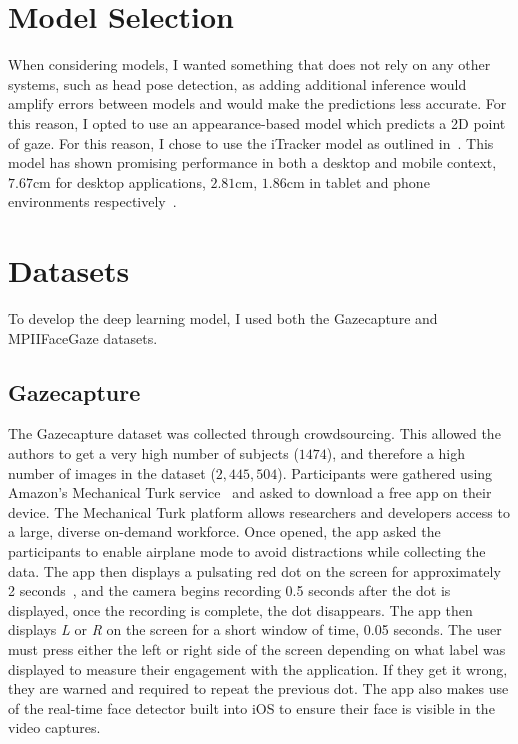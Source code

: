 \documentclass[twocolumn]{report}
\begin{document}
\section{Model Selection}

When considering models, I wanted something that does not rely on any other systems, such as head pose detection, as adding additional inference would amplify errors between models and would make the predictions less accurate. For this reason, I opted to use an appearance-based model which predicts a 2D point of gaze. For this reason, I chose to use the iTracker model as outlined in~\cite{krafka2016eye}. This model has shown promising performance in both a desktop and mobile context, \(7.67\text{cm}\) for desktop applications, \(2.81\text{cm}\), \(1.86\text{cm}\) in tablet and phone environments respectively~\cite{cheng2021survey}.

\section{Datasets}

To develop the deep learning model, I used both the Gazecapture and MPIIFaceGaze datasets. 

\subsection{Gazecapture}

The Gazecapture dataset was collected through crowdsourcing. This allowed the authors to get a very high number of subjects ($1474$), and therefore a high number of images in the dataset ($2,445,504$). Participants were gathered using Amazon's Mechanical Turk service~\cite{mturk} and asked to download a free app on their device. The Mechanical Turk platform allows researchers and developers access to a large, diverse on-demand workforce. Once opened, the app asked the participants to enable airplane mode to avoid distractions while collecting the data. The app then displays a pulsating red dot on the screen for approximately 2 seconds~\cite{krafka2016eye}, and the camera begins recording 0.5 seconds after the dot is displayed, once the recording is complete, the dot disappears. The app then displays \textit{L} or \textit{R} on the screen for a short window of time, 0.05 seconds. The user must press either the left or right side of the screen depending on what label was displayed to measure their engagement with the application. If they get it wrong, they are warned and required to repeat the previous dot. The app also makes use of the real-time face detector built into iOS to ensure their face is visible in the video captures.
\end{document}
